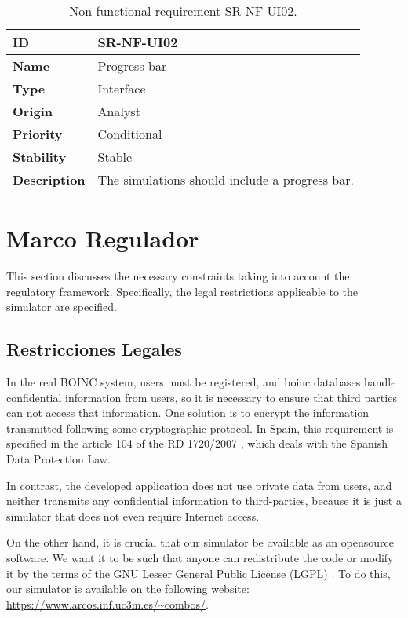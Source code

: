 \begin{center}
\begin{table*}[htbp]
\centering
\begin{tabular}{@{}p{2.5cm} p{9cm}@{}}  
\toprule
\textbf{ID} 				& SR-NF-UI02\\
\midrule
\textbf{Name} 			& Progress bar \\
\midrule
\textbf{Type} 			& Interface \\
\midrule
\textbf{Origin} 			& Analyst \\
\midrule
\textbf{Priority}		& Conditional \\
\midrule
\textbf{Stability} 		& Stable \\
\midrule
\textbf{Description} 	& The simulations should include a progress bar. \\
\bottomrule
\end{tabular}
\caption{Non-functional requirement SR-NF-UI02.}
\label{tab:srnfui02}
\end{table*}
\end{center}

\section{Marco Regulador}
\label{sec:regulatory_framework}

This section discusses the necessary constraints taking into account the regulatory \gls{framework}. Specifically, the legal restrictions applicable to the simulator are specified.

\subsection{Restricciones Legales}
\label{sec:legal_constraints}

In the real BOINC system, users must be registered, and \gls{boinc} databases handle confidential information from users, so it is necessary to ensure that third parties can not access that information. One solution is to encrypt the information transmitted following some cryptographic \gls{protocol}. In Spain, this requirement is specified in the article 104 of the RD 1720/2007 \cite{boe2008}, which deals with the Spanish Data Protection Law. 

In contrast, the developed application does not use private data from users, and neither transmits any confidential information to third-parties, because it is just a simulator that does not even require Internet access.

On the other hand, it is crucial that our simulator be available as an \gls{opensource} software. We want it to be such that anyone can redistribute the code or modify it by the terms of the GNU Lesser General Public License (LGPL) \cite{gnulgpl}. To do this, our simulator is available on the following website: \url{https://www.arcos.inf.uc3m.es/~combos/}.

\afterpage{\blankpage} %